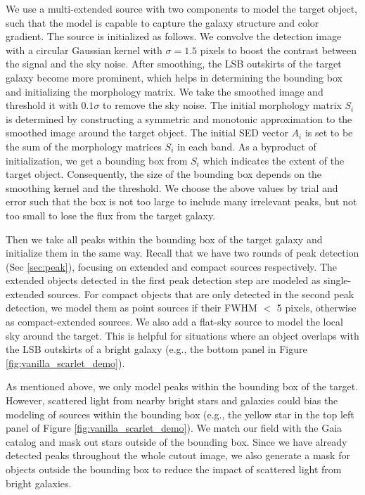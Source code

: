 \documentclass[twocolumn,astrosymb,twocolappendix]{aastex631}
\begin{document}
\begin{CJK*}{UTF8}{gbsn}
We use a multi-extended source with two components to model the target object, such that the model is capable to capture the galaxy structure and color gradient. The source is initialized as follows. We convolve the detection image with a circular Gaussian kernel with $\sigma=1.5$ pixels to boost the contrast between the signal and the sky noise. After smoothing, the LSB outskirts of the target galaxy become more prominent, which helps in determining the bounding box and initializing the morphology matrix. We take the smoothed image and threshold it with $0.1\sigma$ to remove the sky noise. The initial morphology matrix $S_i$ is determined by constructing a symmetric and monotonic approximation to the smoothed image around the target object. The initial SED vector $A_i$ is set to be the sum of the morphology matrices $S_i$ in each band. As a byproduct of initialization, we get a bounding box from $S_i$ which indicates the extent of the target object. Consequently, the size of the bounding box depends on the smoothing kernel and the threshold. We choose the above values by trial and error such that the box is not too large to include many irrelevant peaks, but not too small to lose the flux from the target galaxy. 

Then we take all peaks within the bounding box of the target galaxy and initialize them in the same way. Recall that we have two rounds of peak detection (Sec \ref{sec:peak}), focusing on extended and compact sources respectively. The extended objects detected in the first peak detection step are modeled as single-extended sources. For compact objects that are only detected in the second peak detection, we model them as point sources if their FWHM $<$ 5 pixels, otherwise as compact-extended sources. We also add a flat-sky source to model the local sky around the target. This is helpful for situations where an object overlaps with the LSB outskirts of a bright galaxy (e.g., the bottom panel in Figure \ref{fig:vanilla_scarlet_demo}).

As mentioned above, we only model peaks within the bounding box of the target. However, scattered light from nearby bright stars and galaxies could bias the modeling of sources within the bounding box (e.g., the yellow star in the top left panel of Figure \ref{fig:vanilla_scarlet_demo}). We match our field with the Gaia catalog and mask out stars outside of the bounding box. Since we have already detected peaks throughout the whole cutout image, we also generate a mask for objects outside the bounding box to reduce the impact of scattered light from bright galaxies. 


\end{CJK*}
\end{document}
